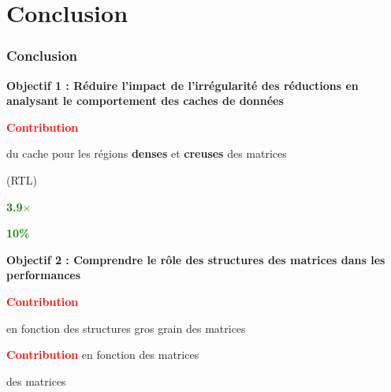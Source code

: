 
\section[Conclusion]{Conclusion}

\begin{frame}
    \frametitle{Conclusion}

    \textbf{\textcolor{Mulberry}{Objectif 1 :} Réduire l'impact de l’irrégularité des réductions en analysant le comportement des caches de données}

    \smallskip
    
    \textbf{\textcolor{Red}{Contribution}}\arrow[\bfseries\color{Red}][1]{SpDCache}

    
     du cache pour les régions \textbf{denses} et \textbf{creuses} des matrices


     (RTL)

     \textbf{\textcolor{Green}{3.9$\times$}}

     \textbf{\textcolor{Green}{10\%}}

    \bigskip

    \textbf{\textcolor{Mulberry}{Objectif 2 :} Comprendre le rôle des structures des matrices dans les performances}

    \smallskip

    \textbf{\textcolor{Red}{Contribution}}\arrow[\bfseries\color{Red}][1]{Modèle analytique}

     en fonction des structures gros grain des matrices


    \smallskip

    \textbf{\textcolor{Red}{Contribution}}\arrow[\bfseries\color{Red}][1]{Analyse des performances} en fonction des matrices

     des matrices
    
\end{frame}

